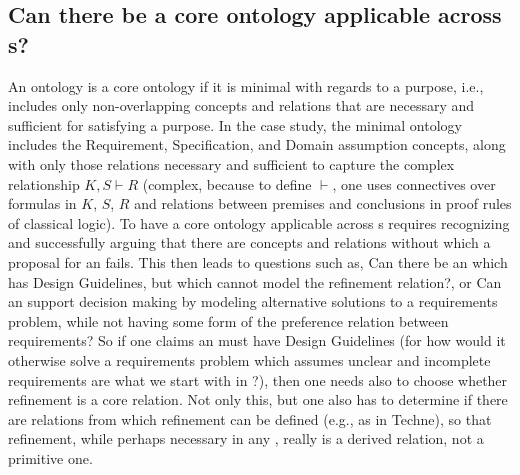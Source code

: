 \documentclass[10pt, final, conference, compsocconf]{IEEEtran}
\begin{document}
\subsection{Can there be a core ontology applicable across s?} An ontology is a core ontology if it is minimal with regards to a purpose, i.e., includes only non-overlapping concepts and relations that are necessary and sufficient for satisfying a purpose. In the case study, the minimal ontology includes the Requirement, Specification, and Domain assumption concepts, along with only those relations necessary and sufficient to capture the complex relationship $K, S \vdash R$ (complex, because to define $\vdash$, one uses connectives over formulas in $K$, $S$, $R$ and relations between premises and conclusions in proof rules of classical logic). To have a core ontology applicable across s requires recognizing and successfully arguing that there are concepts and relations without which a proposal for an  fails. This then leads to questions such as, Can there be an  which has Design Guidelines, but which cannot model the refinement relation?, or Can an  support decision making by modeling alternative solutions to a requirements problem, while not having some form of the preference relation between requirements? So if one claims an  must have Design Guidelines (for how would it otherwise solve a requirements problem which assumes unclear and incomplete requirements are what we start with in ?), then one needs also to choose whether refinement is a core relation. Not only this, but one also has to determine if there are relations from which refinement can be defined (e.g., as in Techne), so that refinement, while perhaps necessary in any , really is a derived relation, not a primitive one.
\end{document}
